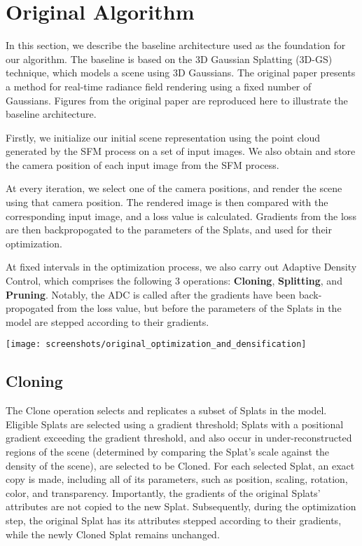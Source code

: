 \documentclass[11pt]{report}
\begin{document}
\section{Original Algorithm}
In this section, we describe the baseline architecture used as the foundation for our algorithm. The baseline is based on the 3D Gaussian Splatting (3D-GS) technique, which models a scene using 3D Gaussians. The original paper presents a method for real-time radiance field rendering using a fixed number of Gaussians. Figures from the original paper are reproduced here to illustrate the baseline architecture.

Firstly, we initialize our initial scene representation using the point cloud generated by the SFM process on a set of input images. We also obtain and store the camera position of each input image from the SFM process.

At every iteration, we select one of the camera positions, and render the scene using that camera position. The rendered image is then compared with the corresponding input image, and a loss value is calculated. Gradients from the loss are then backpropogated to the parameters of the Splats, and used for their optimization.

At fixed intervals in the optimization process, we also carry out Adaptive Density Control, which comprises the following 3 operations: \textbf{Cloning}, \textbf{Splitting}, and \textbf{Pruning}. Notably, the ADC is called after the gradients have been back-propogated from the loss value, but before the parameters of the Splats in the model are stepped according to their gradients.

\begin{center}
\begin{minipage}{0.6\linewidth}
\texttt{[image: screenshots/original\_optimization\_and\_densification]}
\end{minipage}
\end{center}

\subsection{Cloning}
The Clone operation selects and replicates a subset of Splats in the model. Eligible Splats are selected using a gradient threshold; Splats with a positional gradient exceeding the gradient threshold, and also occur in under-reconstructed regions of the scene (determined by comparing the Splat's scale against the density of the scene), are selected to be Cloned. For each selected Splat, an exact copy is made, including all of its parameters, such as position, scaling, rotation, color, and transparency. Importantly, the gradients of the original Splats' attributes are not copied to the new Splat. Subsequently, during the optimization step, the original Splat has its attributes stepped according to their gradients, while the newly Cloned Splat remains unchanged.
\end{document}
